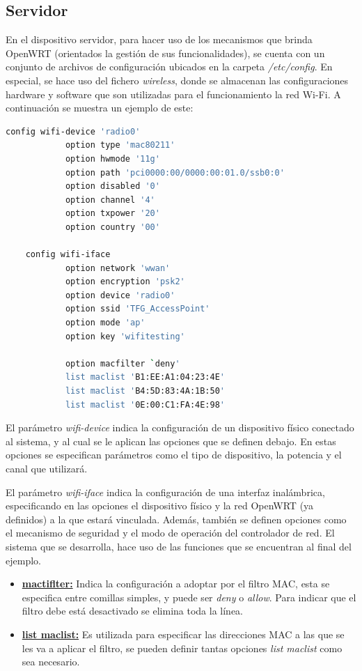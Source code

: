 \documentclass[12pt, twoside]{article}
\begin{document}
    \subsection{Servidor}
        En el dispositivo servidor, para hacer uso de los mecanismos que brinda OpenWRT (orientados la gestión de sus funcionalidades), se cuenta con un conjunto de archivos de configuración ubicados en la carpeta \textit{/etc/config}. En especial, se hace uso del fichero \textit{wireless}, donde se almacenan las configuraciones hardware y software que son utilizadas para el funcionamiento la red Wi-Fi. A continuación se muestra un ejemplo de este:

        \begin{lstlisting}[caption=/etc/config/wireless, language=bash]
    config wifi-device 'radio0'
            option type 'mac80211'
            option hwmode '11g'
            option path 'pci0000:00/0000:00:01.0/ssb0:0'
            option disabled '0'
            option channel '4'
            option txpower '20'
            option country '00'

    config wifi-iface
            option network 'wwan'
            option encryption 'psk2'
            option device 'radio0'
            option ssid 'TFG_AccessPoint'
            option mode 'ap'
            option key 'wifitesting'

            option macfilter `deny'
            list maclist 'B1:EE:A1:04:23:4E'
            list maclist 'B4:5D:83:4A:1B:50'
            list maclist '0E:00:C1:FA:4E:98'
        \end{lstlisting}

        El parámetro \textit{wifi-device} indica la configuración de un dispositivo físico conectado al sistema, y al cual se le aplican las opciones que se definen debajo. En estas opciones se especifican parámetros como el tipo de dispositivo, la potencia y el canal que utilizará.

        El parámetro \textit{wifi-iface} indica la configuración de una interfaz inalámbrica, especificando en las opciones el dispositivo físico y la red OpenWRT (ya definidos) a la que estará vinculada. Además, también se definen opciones como el mecanismo de seguridad y el modo de operación del controlador de red. El sistema que se desarrolla, hace uso de las funciones que se encuentran al final del ejemplo.
        
        \begin{itemize}
            \item \textbf{\underline{mactiflter:}} Indica la configuración a adoptar por el filtro MAC, esta se especifica entre comillas simples, y puede ser \textit{deny} o \textit{allow}. Para indicar que el filtro debe está desactivado se elimina toda la línea.
            \item \textbf{\underline{list maclist:}} Es utilizada para especificar las direcciones MAC a las que se les va a aplicar el filtro, se pueden definir tantas opciones \textit{list maclist} como sea necesario.
        \end{itemize}
\end{document}
